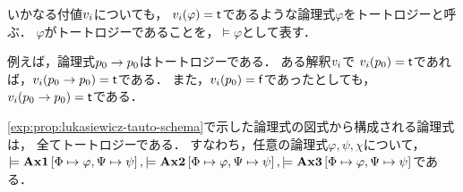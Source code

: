 \begin{myDefinition}[トートロジー]
  いかなる付値$\PropValuation_\PropInterpret$についても，
  $\PropValuation_\PropInterpret(\varphi) = \True$であるような論理式$\varphi$をトートロジーと呼ぶ．
  $\varphi$がトートロジーであることを，$\models \varphi$として表す．
\end{myDefinition}

\begin{myExample}[トートロジーの例]
  例えば，論理式$p_0 \limp p_0$はトートロジーである．
  ある解釈$\PropValuation_\PropInterpret$で
  $\PropValuation_\PropInterpret(p_0) = \True$であれば，$\PropValuation_\PropInterpret(p_0 \to p_0) = \True$である．
  また，$\PropValuation_\PropInterpret(p_0) = \False$であったとしても，$\PropValuation_\PropInterpret(p_0 \to p_0) = \True$である．
\end{myExample}

\begin{myCorollary}
  \ref*{exp:prop:lukasiewicz-tauto-schema}で示した論理式の図式から構成される論理式は，
  全てトートロジーである．
  すなわち，任意の論理式$\varphi,\psi,\chi$について，
  $
    \models \AxiomSchema[1]\left[\Phi \mapsto \varphi, \Psi \mapsto \psi\right],
    \models \AxiomSchema[2]\left[\Phi \mapsto \varphi, \Psi \mapsto \psi\right],
    \models \AxiomSchema[3]\left[\Phi \mapsto \varphi, \Psi \mapsto \psi\right]
  $である．
\end{myCorollary}
